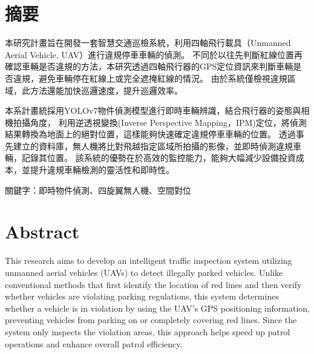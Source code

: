 \documentclass[12pt]{article}       %
\begin{document}
\setcounter{page}{1}  %


\section*{\centering 摘要}  %


\hspace{2em}
本研究計畫旨在開發一套智慧交通巡檢系統，利用四軸飛行載具（Unmanned Aerial Vehicle, UAV）進行違規停車車輛的偵測。
不同於以往先判斷紅線位置再確認車輛是否違規的方法，本研究透過四軸飛行器的GPS定位資訊來判斷車輛是否違規，避免車輛停在紅線上或完全遮掩紅線的情況。
由於系統僅檢視違規區域，此方法還能加快巡邏速度，提升巡邏效率。

本系計畫統採用YOLOv7物件偵測模型進行即時車輛辨識，結合飛行器的姿態與相機拍攝角度，
利用逆透視變換(Inverse Perspective Mapping，IPM)定位，將偵測結果轉換為地面上的絕對位置，這樣能夠快速確定違規停車車輛的位置。
透過事先建立的資料庫，無人機將比對飛越指定區域所拍攝的影像，並即時偵測違規車輛，記錄其位置。
該系統的優勢在於高效的監控能力，能夠大幅減少設備投資成本，並提升違規車輛檢測的靈活性和即時性。

\vspace{1.5em}
\noindent 關鍵字：即時物件偵測、四旋翼無人機、空間對位
\newpage  %

\section*{\centering Abstract}  %
\hspace{2em}This research aims to develop an intelligent traffic inspection system utilizing unmanned aerial vehicles (UAVs) to detect illegally parked vehicles.
Unlike conventional methods that first identify the location of red lines and then verify whether vehicles are violating parking regulations, this system determines whether a vehicle is in violation by using the UAV's GPS positioning information, preventing vehicles from parking on or completely covering red lines.
Since the system only inspects the violation areas, this approach helps speed up patrol operations and enhance overall patrol efficiency.
\end{document}
